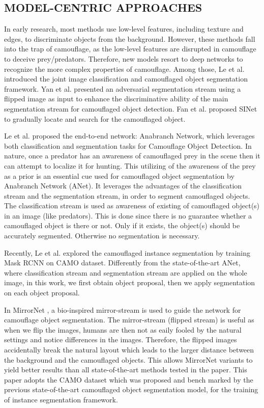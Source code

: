 \documentclass[conference]{IEEEtran}
\begin{document}
\subsection{MODEL-CENTRIC APPROACHES }
In early research, most methods use low-level features, including texture and edges, to discriminate objects from the background. However, these methods fall into the trap of camouflage, as the low-level features are disrupted in camouflage to deceive prey/predators. Therefore, new models resort to deep networks to recognize the more complex properties of camouflage. Among those, Le et al. \cite{le2019anabranch} introduced the joint image classification and camouflaged object segmentation framework. Yan et al. \cite{yan2021mirrornet}  presented an adversarial segmentation stream using a flipped image as input to enhance the discriminative ability of the main segmentation stream for camouflaged object detection. Fan et al. \cite{9156837} proposed SINet to gradually locate and search for the camouflaged object.


Le et al. \cite{le2019anabranch}  proposed the end-to-end network: Anabranch Network, which leverages both classification and segmentation tasks for Camouflage Object Detection.  In nature, once a predator has an awareness of camouflaged prey in the scene then it can attempt to localize it for hunting. This utilizing of the awareness of the prey as a prior is an essential cue used for camouflaged object segmentation by Anabranch Network (ANet). It leverages the advantages of the classification stream and the segmentation stream, in order to segment camouflaged objects. The classification stream is used as awareness of existing of camouflaged object(s) in an image (like predators). This is done since there is no guarantee whether a camouflaged object is there or not. Only if it exists, the object(s) should be accurately segmented. Otherwise no segmentation is necessary. 


Recently, Le et al. \cite{DBLP:journals/corr/abs-2103-17123} explored the camouflaged instance segmentation by training Mask RCNN on CAMO dataset. Differently from the state-of-the-art ANet, where classification stream and segmentation stream are applied on the whole image, in this work, we first obtain object proposal, then we apply segmentation on each object proposal.



In MirrorNet \cite{yan2021mirrornet}, a bio-inspired mirror-stream is used to guide the network for camouflage object segmentation. The mirror-stream (flipped stream) is useful as when we flip the images, humans are then not as eaily fooled by the natural settings and notice differences in the images. Therefore, the flipped images accidentally break the natural layout which leads to the larger distance between the background and the camouflaged objects. This allows MirrorNet variants to yield better results than all state-of-the-art methods tested in the paper. This paper adopts the CAMO dataset which was proposed and bench marked by the previous state-of-the-art camouflaged object segmentation model, for the training of instance segmentation framework.
\end{document}
